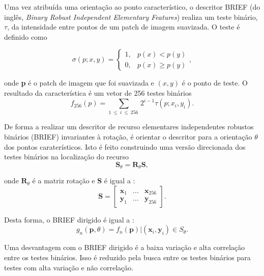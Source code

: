 Uma vez atribuída uma orientação ao ponto característico, o descritor BRIEF (do inglês, \textit{Binary Robust Independent Elementary Features}) realiza um teste binário, $\tau$, da intensidade entre pontos de um patch de imagem suavizada. O teste é definido como  


\begin{equation}\label{equacao2.5.1.4}
\sigma (p;x,y) = \left\{ 
\begin{array}{cc}
1, & p(x)<p(y) \\ 
0, & p(x) \geq  p(y)   
\end{array} \right., 
\end{equation}

onde \textbf{p} é o patch de imagem que foi suavizada e \textbf{$(x,y)$} é o ponto de teste.
O resultado da característica é um vetor de 256 testes binários 
\begin{equation}\label{equacao2.5.1.5}
f_{256} \left( p \right) = \sum_{1\ \le\ i\ \le\ 256\ } {2^{i-1}\tau\left(p;x_i,y_i\right) } .
\end{equation} 

De forma a realizar um descritor de recurso elementares independentes robustos binários (BRIEF) invariantes à rotação, é orientar o descritor para a orientação $\theta$ dos pontos caraterísticos. Isto é feito construindo uma versão direcionada dos testes binários na localização do recurso 
\begin{equation}\label{equacao2.5.1.6}
\textbf{$\textbf{S}_{\theta} = \textbf{R}_{\theta}\textbf{S}$},
\end{equation} 

 onde \textbf{$\textbf{R}_{\theta}$} é a matriz rotação e \textbf{S} é igual a : 
 \begin{equation}\label{equacao2.5.1.7}
  \textbf{S} = \left[ \begin{array}{ccc}
\textbf{x}_1 & ... & \textbf{x}_{256}\\
\textbf{y}_1 & ... & \textbf{y}_{256}
\end{array} \right] . 
\end{equation}


Desta forma, o BRIEF dirigido é igual a : 
\begin{equation}\label{equacao2.5.1.8} g_n(\textbf{p},\theta) = f_n(\textbf{p})|(\textbf{x}_i,\textbf{y}_i) \in S_{\theta} .
\end{equation}


Uma desvantagem com o BRIEF dirigido é a baixa variação e alta correlação entre os testes binários. Isso é reduzido pela busca entre os testes binários para testes com alta variação e não correlação. 	


